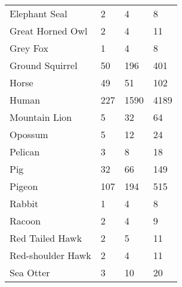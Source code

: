 \begin{table}[t]
\begin{tabular}{|l|l|l|l|}
Elephant Seal         & 2                              & 4                              & 8                              \\
Great Horned Owl      & 2                              & 4                              & 11                             \\
Grey Fox              & 1                              & 4                              & 8                              \\
Ground Squirrel       & 50                             & 196                            & 401                            \\
Horse                 & 49                             & 51                             & 102                            \\
Human                 & 227                            & 1590                           & 4189                           \\
Mountain Lion         & 5                              & 32                             & 64                             \\
Opossum               & 5                              & 12                             & 24                             \\
Pelican               & 3                              & 8                              & 18                             \\
Pig                   & 32                             & 66                             & 149                            \\
Pigeon                & 107                            & 194                            & 515                            \\
Rabbit                & 1                              & 4                              & 8                              \\
Racoon                & 2                              & 4                              & 9                              \\
Red Tailed Hawk       & 2                              & 5                              & 11                             \\
Red-shoulder Hawk     & 2                              & 4                              & 11                             \\
Sea Otter             & 3                              & 10                             & 20                             \\

\end{tabular}
\end{table}
